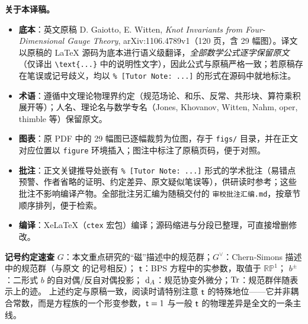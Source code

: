 \begin{transnote}
\textbf{关于本译稿。}
\begin{itemize}\setlength{\itemsep}{2pt}
\item \textbf{底本}：英文原稿 D. Gaiotto, E. Witten, \emph{Knot Invariants from Four-Dimensional Gauge Theory}, arXiv:1106.4789v1（120 页，含 29 幅图）。译文以原稿的 \LaTeX{} 源码为底本进行语义级翻译，\emph{全部数学公式逐字保留原文}（仅译出 \verb|\text{...}| 中的说明性文字），因此公式与原稿严格一致；若原稿存在笔误或记号歧义，均以 \verb|% [Tutor Note: ...]| 的形式在源码中就地标注。
\item \textbf{术语}：遵循中文理论物理界约定（规范场论、和乐、反常、共形块、算符乘积展开等）；人名、理论名与数学专名（Jones, Khovanov, Witten, Nahm, oper, thimble 等）保留原文。
\item \textbf{图表}：原 PDF 中的 29 幅图已逐幅裁剪为位图，存于 \verb|figs/| 目录，并在正文对应位置以 \verb|figure| 环境插入；图注中标注了原稿页码，便于对照。
\item \textbf{批注}：正文关键推导处嵌有 \verb|% [Tutor Note: ...]| 形式的学术批注（易错点预警、作者省略的证明、约定差异、原文疑似笔误等），供研读时参考；这些批注不影响编译产物。全部批注另汇编为随稿交付的 \verb|审校批注汇编.md|，按章节顺序排列，便于检索。
\item \textbf{编译}：XeLaTeX（\verb|ctex| 宏包）编译；源码缩进与分段已整理，可直接增删修改。
\end{itemize}
\end{transnote}

\vspace{0.5em}
\noindent\textbf{记号约定速查}\quad
$G$：本文重点研究的“磁”描述中的规范群；$G^\vee$：Chern-Simons 描述中的规范群（与原文 \cite{fiveknots} 的记号相反）；
${ \sf t}$：BPS 方程中的实参数，取值于 $\mathbb{RP}^1$；
$b^\pm$：二形式 $b$ 的自对偶/反自对偶投影；
${\mathrm d}_A$：规范协变外微分；${\mathrm {Tr}}$：规范群伴随表示上的迹。
上述约定与原稿一致，阅读时请特别注意 ${ \sf t}$ 的特殊地位——它并非耦合常数，而是方程族的一个形变参数，${ \sf t}=1$ 与一般 ${ \sf t}$ 的物理差异是全文的一条主线。

\newpage
\tableofcontents
\newpage

